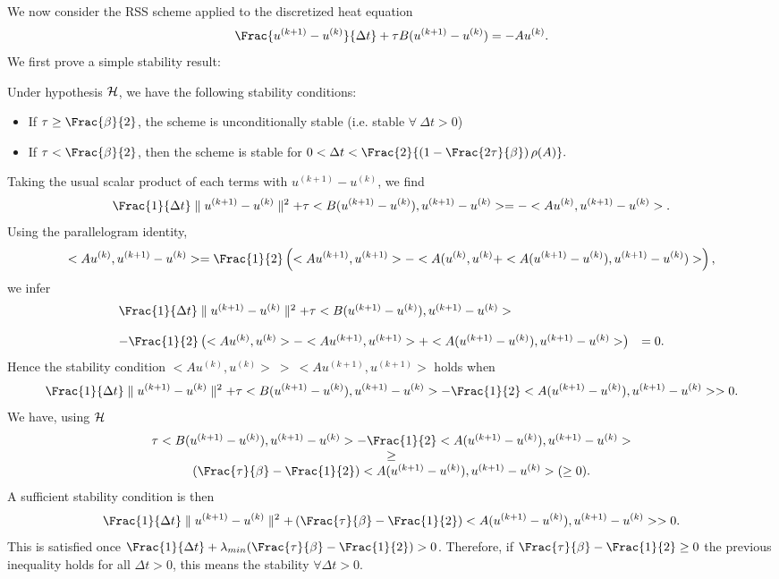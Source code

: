 {We now consider the RSS scheme applied to the discretized heat equation
$$
 \Frac{u^{(k+1)}-u^{(k)}}{\Delta t} +\tau B (u^{(k+1)}-u^{(k)}) =-Au^{(k)}.
 $$
We first prove a simple stability result:
\begin{proposition_amiens}
Under hypothesis ${\cal H}$, we have the following stability conditions:
\begin{itemize}
\item If $\tau\ge \Frac{\beta}{2}$, the scheme is unconditionally stable (i.e. stable $\forall \ \Delta t >0$)
\item If $\tau < \Frac{\beta}{2}$, then the scheme is stable for
$
0<\Delta t < \Frac{2}{\left(1-\Frac{2\tau}{\beta}\right)\rho(A)}.
$
\end{itemize} 
\label{RSS_Stab_lin}
\end{proposition_amiens}
\begin{proof_amiens}
Taking the usual scalar product of each terms with $u^{(k+1)}-u^{(k)}$, we find
$$
\Frac{1}{\Delta t} \parallel u^{(k+1)}-u^{(k)} \parallel^2
+\tau <B(u^{(k+1)}-u^{(k)}),u^{(k+1)}-u^{(k)}> = -<Au^{(k)},u^{(k+1)}-u^{(k)}>.
$$
Using the parallelogram identity, 
$$
<Au^{(k)},u^{(k+1)}-u^{(k)}>=\Frac{1}{2}\left( <Au^{(k+1)},u^{(k+1)}>-<A(u^{(k)},u^{(k)}+<A(u^{(k+1)}-u^{(k)}),u^{(k+1)}-u^{(k)})>\right),
$$
we infer
$$
\begin{array}{ll}
\Frac{1}{\Delta t} \parallel u^{(k+1)}-u^{(k)} \parallel^2
+\tau <B(u^{(k+1)}-u^{(k)}),u^{(k+1)}-u^{(k)}> & \\
&\\
-\Frac{1}{2}\left(<Au^{(k)},u^{(k)}> -<Au^{(k+1)},u^{(k+1)}>+
<A(u^{(k+1)}-u^{(k)}),u^{(k+1)}-u^{(k)}>\right)&=0.\\
\end{array}
$$
Hence the stability condition $<Au^{(k)},u^{(k)}> \ >  \ <Au^{(k+1)},u^{(k+1)}>$ holds when
$$
\Frac{1}{\Delta t} \parallel u^{(k+1)}-u^{(k)} \parallel^2
+\tau <B(u^{(k+1)}-u^{(k)}),u^{(k+1)}-u^{(k)}> 
-\Frac{1}{2}
<A(u^{(k+1)}-u^{(k)}),u^{(k+1)}-u^{(k)}>>0.
$$
We have, using ${\cal H}$
$$
\begin{array}{c}
\tau <B(u^{(k+1)}-u^{(k)}),u^{(k+1)}-u^{(k)}> 
-\Frac{1}{2}
<A(u^{(k+1)}-u^{(k)}),u^{(k+1)}-u^{(k)}>\\
\ge \\
 \left(\Frac{\tau}{\beta}-\Frac{1}{2}\right) <A(u^{(k+1)}-u^{(k)}),u^{(k+1)}-u^{(k)}> (\ge 0).
 \end{array}
$$
A sufficient stability condition is then
$$
\Frac{1}{\Delta t} \parallel u^{(k+1)}-u^{(k)} \parallel^2
+ \left(\Frac{\tau}{\beta}-\Frac{1}{2}\right) <A(u^{(k+1)}-u^{(k)}),u^{(k+1)}-u^{(k)}> >0.
$$
This is satisfied once $\Frac{1}{\Delta t}+\lambda_{min}(\Frac{\tau}{\beta}-\Frac{1}{2})>0$.
Therefore, if $\Frac{\tau}{\beta}-\Frac{1}{2} \ge 0$ the previous inequality holds for all $\Delta t >0$, this means
the stability $\forall \Delta t >0$.


\end{proof_amiens}}

